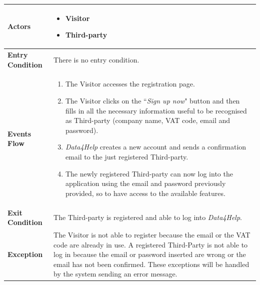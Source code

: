             \begin{table}[H]
            	\centering
                \begin{tabular}{|p{3cm}|p{8.2cm}|}
                    \hline
                    \textbf{Actors} &  \begin{itemize}
                        \item Visitor
                        \item Third-party
                    \end{itemize} \\
                     \hline
                    \textbf{Entry Condition} & There is no entry condition. \\
                     \hline
                    \textbf{Events Flow} & \begin{enumerate}
                        \item The Visitor accesses the registration page.
                        \item The Visitor clicks on the ``\emph{Sign up now}" button and then fills in all the necessary information useful to be recognised as Third-party (company name, VAT code, email and password).
                        \item \emph{Data4Help} creates a new account and sends a confirmation email to the just registered Third-party.
                        \item The newly registered Third-party can now log into the application using the email and password previously provided, so to have access to the available features.
                    \end{enumerate} \\
                     \hline
                    \textbf{Exit Condition} & The Third-party is registered and able to log into \emph{Data4Help}. \\
                     \hline
                    \textbf{Exception} & The Visitor is not able to register because the email or the VAT code                      are already in use. \newline
                                         A registered Third-Party is not able to log in because the email or password inserted are wrong or the email has not been confirmed. \newline
                                         These exceptions will be handled by the system sending an error message. \\
                     \hline
                \end{tabular}  
            \end{table}
            
